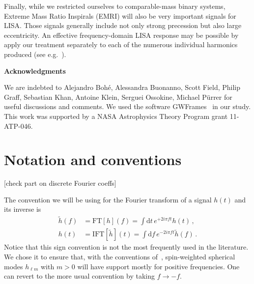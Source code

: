 \documentclass[aps,showpacs,twocolumn,
prd,superscriptaddress,nofootinbib]{revtex4-1}
\newcommand\ud{{\mathrm{d}}}
\newcommand{\SM}[1]{{\color{Red} #1}}
\begin{document}
Finally, while we restricted ourselves to comparable-mass binary systems, Extreme Mass Ratio Inspirals (EMRI) will also be very important signals for LISA. Those signals generally include not only strong precession but also large eccentricity. An effective frequency-domain LISA response may be possible by apply our treatment separately to each of the numerous individual harmonics produced (see e.g.~\cite{Chua+17}).
 


\vspace{4.5mm}

\hspace{0.85in}
{\bf Acknowledgments}

\vspace{3.5mm}

We are indebted to Alejandro Boh\'{e}, Alessandra Buonanno, Scott Field, Philip Graff, Sebastian Khan, Antoine Klein, Serguei Ossokine, Michael P\"{u}rrer for useful discussions and comments. We used the software GWFrames~\cite{Boyle13, Boyle+14} in our study. This work was supported by a NASA Astrophysics Theory Program grant 11-ATP-046.


\appendix

\section{Notation and conventions}
\label{app:notation}

\SM{[check part on discrete Fourier coeffs]}

The convention we will be using for the Fourier transform of a signal $h(t)$ and its inverse is
\begin{subequations}
\label{eq:defFT}
\begin{align}
	\tilde{h}(f) &= \mathrm{FT}[h](f) =  \int \ud t \, e^{+2i\pi f t} h(t) \,, \\
	h(t) &= \mathrm{IFT}[\tilde{h}](t) =  \int \ud f \, e^{-2i\pi f t} \tilde{h}(f) \,.
\end{align}
\end{subequations}
Notice that this sign convention is not the most frequently used in the literature. We chose it to ensure that, with the conventions of~\cite{BlanchetLiving}, spin-weighted spherical modes $h_{\ell m}$ with $m>0$ will have support mostly for positive frequencies. One can revert to the more usual convention by taking $f\rightarrow -f$.
\end{document}
